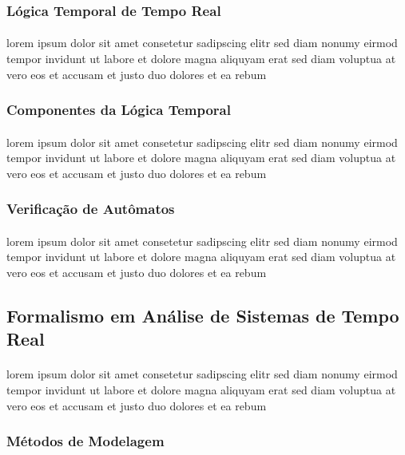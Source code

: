 \subsubsection{Lógica Temporal de Tempo Real}
\paragraph{}
lorem ipsum dolor sit amet consetetur sadipscing elitr sed diam nonumy
eirmod tempor invidunt ut labore et dolore magna aliquyam erat sed diam
voluptua at vero eos et accusam et justo duo dolores et ea rebum

\subsubsection{Componentes da Lógica Temporal}
\paragraph{}
lorem ipsum dolor sit amet consetetur sadipscing elitr sed diam nonumy
eirmod tempor invidunt ut labore et dolore magna aliquyam erat sed diam
voluptua at vero eos et accusam et justo duo dolores et ea rebum

\subsubsection{Verificação de Autômatos}
\paragraph{}
lorem ipsum dolor sit amet consetetur sadipscing elitr sed diam nonumy
eirmod tempor invidunt ut labore et dolore magna aliquyam erat sed diam
voluptua at vero eos et accusam et justo duo dolores et ea rebum

\subsection{Formalismo em Análise de Sistemas de Tempo Real}
\paragraph{}
lorem ipsum dolor sit amet consetetur sadipscing elitr sed diam nonumy
eirmod tempor invidunt ut labore et dolore magna aliquyam erat sed diam
voluptua at vero eos et accusam et justo duo dolores et ea rebum

\subsubsection{Métodos de Modelagem}
